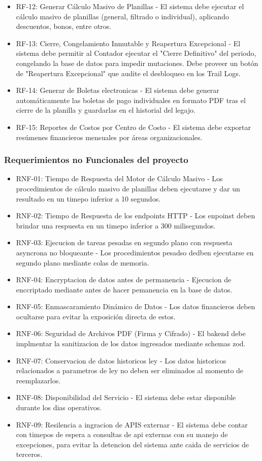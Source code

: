 \begin{itemize}
    \item RF-12: Generar Cálculo Masivo de Planillas  - El sistema debe ejecutar el cálculo masivo de planillas (general, filtrado o individual), aplicando descuentos, bonos, entre otros.
    \item RF-13: Cierre, Congelamiento Inmutable y Reapertura Excepcional - El sistema debe permitir al Contador ejecutar el "Cierre Definitivo" del periodo, congelando la base de datos para impedir mutaciones. Debe proveer un botón de "Reapertura Excepcional" que audite el desbloqueo en los Trail Logs.
    \item RF-14: Generar de Boletas electronicas - El sistema debe generar automáticamente las boletas de pago individuales en formato PDF tras el cierre de la planilla y guardarlas en el historial del legajo.
    \item RF-15: Reportes de Costos por Centro de Costo - El sistema debe exportar resúmenes financieros mensuales por áreas organizacionales.
  \end{itemize}
\subsubsection{Requerimientos no Funcionales del proyecto}
  \begin{itemize}
    \item RNF-01: Tiempo de Respuesta del Motor de Cálculo Masivo - Los procedimientos de cálculo masivo de planillas deben ejecutarse y dar un resultado en un timepo inferior a 10 segundos. 
    \item RNF-02: Tiempo de Respuesta de los endpoints HTTP - Los enpoinst deben brindar una respuesta en un timepo inferior a 300 milisegundos. 
    \item RNF-03: Ejecucion de tareas pesadas en segundo plano con respuesta asyncrona no bloqueante - Los procedimientos pesadso dedben ejecutarse en segundo plano mediante colas de memoria. 
    \item RNF-04: Encryptacion de datos antes de permanencia - Ejecucion de enccriptado mediante antes de hacer pemanencia en la base de datos.
    \item RNF-05: Enmascaramiento Dinámico de Datos - Los datos financieros deben ocultarse para evitar la exposición directa de estos.
    \item RNF-06: Seguridad de Archivos PDF (Firma y Cifrado) - El bakend debe implmentar la sanitizacion de los datos ingresados mediante schemas zod.
    \item RNF-07: Conservacion de datos historicos ley - Los datos historicos relacionados a parametros de ley no deben ser eliminados al momento de reemplazarlos.
    \item RNF-08: Disponibilidad del Servicio - El sistema debe estar disponible durante los dias operativos.
    \item RNF-09: Resilencia a ingracion de APIS externar - El sistema debe contar con timepos de espera a consultas de api externas con su manejo de excepciones, para evitar la detencion del sistema ante caida de servicios de terceros. 
  \end{itemize}